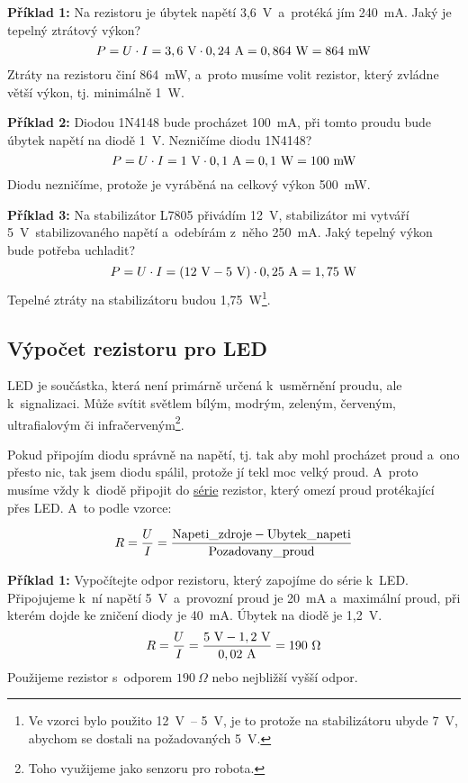 {\bf Příklad 1:} Na rezistoru je úbytek napětí 3,6~V~a~protéká jím 240~mA. Jaký je tepelný ztrátový výkon?
$$P = U \cdot I = \rm 3,6\ V \cdot 0,24\ A = 0,864\ W = 864\ mW$$
Ztráty na rezistoru činí 864~mW, a~proto musíme volit rezistor, který zvládne větší výkon, tj. minimálně 1~W. 

{\bf Příklad 2:} Diodou 1N4148 bude procházet 100~mA, při tomto proudu bude úbytek napětí na diodě 1~V. Nezničíme diodu 1N4148?
$$P = U \cdot I = \rm 1\ V \cdot 0,1\ A = 0,1\ W = 100\ mW$$
Diodu nezničíme, protože je vyráběná na celkový výkon 500~mW. 

{\bf Příklad 3:} Na stabilizátor L7805 přivádím 12~V, 
stabilizátor mi vytváří 5~V~stabilizovaného napětí a~odebírám z~něho 250~mA. 
Jaký tepelný výkon bude potřeba uchladit?
$$P = U \cdot I = \rm (12\ V - 5\ V) \cdot 0,25\ A = 1,75\ W$$
Tepelné ztráty na stabilizátoru budou 1,75~W\footnote{Ve vzorci bylo použito 12~V~-- 5~V,
	 je to protože na stabilizátoru ubyde 7~V, abychom se dostali na požadovaných 5~V.}.


\subsection{Výpočet rezistoru pro LED}

LED  je součástka, 
která není primárně určená k~usměrnění proudu, ale k~signalizaci. 
Může svítit světlem bílým, modrým, zeleným, červeným, ultrafialovým či infračerveným\footnote{Toho využijeme jako senzoru pro robota.}.

Pokud připojím diodu správně na napětí, tj. tak aby mohl procházet proud a~ono přesto nic,
 tak jsem diodu spálil, protože jí tekl moc velký proud. A~proto musíme vždy k~diodě připojit do  
 \hyperlink{serie}{série}  rezistor, který omezí proud protékající přes LED. A~to podle vzorce:

$$R = \frac{U}{I} = \rm \frac{Napeti\_zdroje - Ubytek\_napeti}{Pozadovany\_proud}$$

{\bf Příklad 1:} Vypočítejte odpor rezistoru, který zapojíme do série k~LED. 
Připojujeme k~ní napětí 5~V~a~provozní proud je 20~mA a~maximální proud, při kterém dojde ke zničení diody je 40~mA. Úbytek na diodě je 1,2~V.
$$R = \frac{U}{I} = \rm \frac{5\ V - 1,2 \ V}{0,02 \ A} = 190\ \Omega$$
Použijeme rezistor s~odporem $190\ \Omega$ nebo nejbližší vyšší odpor.

